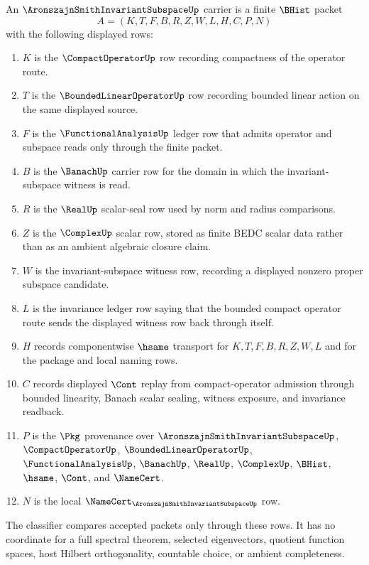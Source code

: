 \begin{definition}
\label{def:aronszajn-smith-invariant-subspace-carrier}
An $\AronszajnSmithInvariantSubspaceUp$ carrier is a finite $\BHist$ packet
$$
A=(K,T,F,B,R,Z,W,L,H,C,P,N)
$$
with the following displayed rows:
\begin{enumerate}
\item $K$ is the $\CompactOperatorUp$ row recording compactness of the operator route.
\item $T$ is the $\BoundedLinearOperatorUp$ row recording bounded linear action on the same displayed source.
\item $F$ is the $\FunctionalAnalysisUp$ ledger row that admits operator and subspace reads only through the finite packet.
\item $B$ is the $\BanachUp$ carrier row for the domain in which the invariant-subspace witness is read.
\item $R$ is the $\RealUp$ scalar-seal row used by norm and radius comparisons.
\item $Z$ is the $\ComplexUp$ scalar row, stored as finite BEDC scalar data rather than as an ambient algebraic closure claim.
\item $W$ is the invariant-subspace witness row, recording a displayed nonzero proper subspace candidate.
\item $L$ is the invariance ledger row saying that the bounded compact operator route sends the displayed witness row back through itself.
\item $H$ records componentwise $\hsame$ transport for $K,T,F,B,R,Z,W,L$ and for the package and local naming rows.
\item $C$ records displayed $\Cont$ replay from compact-operator admission through bounded linearity, Banach scalar sealing, witness exposure, and invariance readback.
\item $P$ is the $\Pkg$ provenance over $\AronszajnSmithInvariantSubspaceUp$, $\CompactOperatorUp$, $\BoundedLinearOperatorUp$, $\FunctionalAnalysisUp$, $\BanachUp$, $\RealUp$, $\ComplexUp$, $\BHist$, $\hsame$, $\Cont$, and $\NameCert$.
\item $N$ is the local $\NameCert_{\AronszajnSmithInvariantSubspaceUp}$ row.
\end{enumerate}
The classifier compares accepted packets only through these rows. It has no coordinate for a full spectral theorem, selected eigenvectors, quotient function spaces, host Hilbert orthogonality, countable choice, or ambient completeness.
\end{definition}

